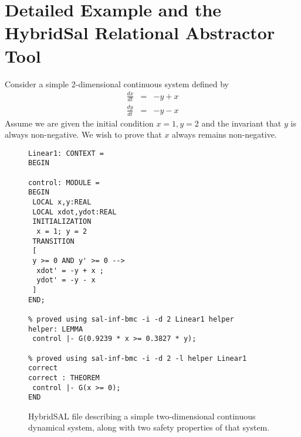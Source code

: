 \documentclass{article}
\begin{document}



\appendix
\section{Detailed Example and the HybridSal Relational Abstractor Tool}

Consider a simple 2-dimensional continuous system defined by
\begin{eqnarray*}
\frac{dx}{dt} & = & -y + x
\\
\frac{dy}{dt} & = & -y - x
\end{eqnarray*}
Assume we are given the initial condition $x = 1, y = 2$
and the invariant that $y$ is always non-negative.
We wish to prove that $x$ always remains non-negative.

\begin{figure}[t]
\begin{tt}
\begin{verbatim}
Linear1: CONTEXT = 
BEGIN

control: MODULE =
BEGIN
 LOCAL x,y:REAL
 LOCAL xdot,ydot:REAL
 INITIALIZATION
  x = 1; y = 2
 TRANSITION
 [
 y >= 0 AND y' >= 0 --> 
  xdot' = -y + x ;
  ydot' = -y - x
 ]
END;

% proved using sal-inf-bmc -i -d 2 Linear1 helper
helper: LEMMA
 control |- G(0.9239 * x >= 0.3827 * y);

% proved using sal-inf-bmc -i -d 2 -l helper Linear1 correct
correct : THEOREM
 control |- G(x >= 0);
END
\end{verbatim}
\end{tt}
\caption{HybridSAL file describing a simple two-dimensional
continuous dynamical system, along with two safety
properties of that system.}\label{fig:hsal-ex}
\end{figure}
\end{document}

